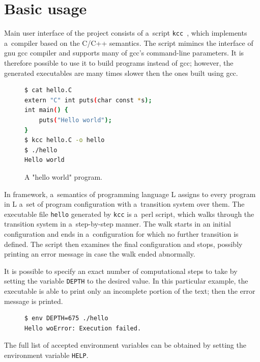 \documentclass{fithesis3}
\newcommand{\kcc}{\texttt{kcc}\xspace}
\begin{document}
\section{Basic usage}

Main user interface of the project consists of a~script \kcc~\cite{hathhorn-ellison-rosu-2015-pldi}, which implements a~compiler based on the C/C++ semantics. The script mimincs the interface of gnu gcc compiler and supports many of gcc's command-line parameters. It is therefore possible to use it to build programs instead of gcc; however, the generated executables are many times slower then the ones built using gcc.

\begin{figure}[h]
\begin{lstlisting}[language=bash]
$ cat hello.C
extern "C" int puts(char const *s);
int main() {
	puts("Hello world");
}
$ kcc hello.C -o hello
$ ./hello
Hello world
\end{lstlisting}
\caption{A "hello world" program.}
\label{helloWorldSource}
\end{figure}

In \K framework, a~semantics of programming language L assigns to every program in L a~set of program configuration with a~transition system over them. The executable file \texttt{hello} generated by \kcc is a~perl script, which walks through the transition system in a~step-by-step manner. The walk starts in an initial configuration and ends in a~configuration for which no further transition is defined. The script then examines the final configuration and stops, possibly printing an error message in case the walk ended abnormally.

It is possible to specify an exact number of computational steps to take by setting the variable \texttt{DEPTH} to the desired value. In this particular example, the executable is able to print only an incomplete portion of the text; then the error message is printed. 

\begin{figure}[h]
\begin{lstlisting}[language=bash]
$ env DEPTH=675 ./hello
Hello woError: Execution failed.
\end{lstlisting}
\end{figure}

The full list of accepted environment variables can be obtained by setting the environment variable \texttt{HELP}.

\end{document}
